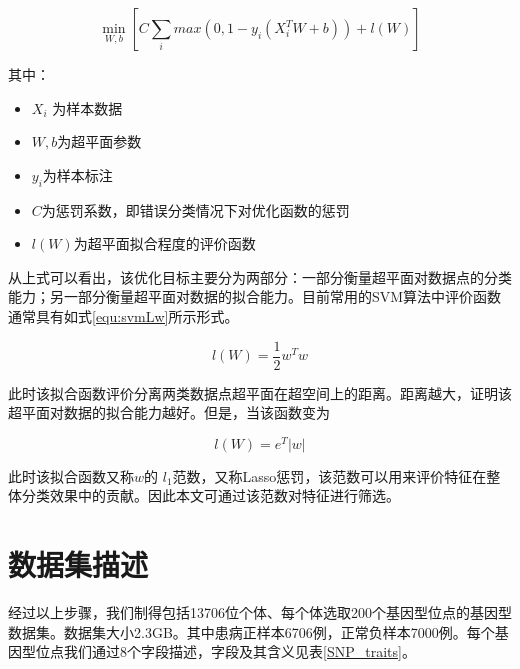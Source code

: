 \begin{equation}
    \min_{W,b} [C\sum_{i}max(0,1-y_i(X_i^TW+b))+l(W)]
\end{equation}

其中：

\begin{itemize}
\item
  \(X_i\) 为样本数据
\item
  \(W,b\)为超平面参数
\item
  \(y_i\)为样本标注
\item
  \(C\)为惩罚系数，即错误分类情况下对优化函数的惩罚
\item
  \(l(W)\)为超平面拟合程度的评价函数
\end{itemize}

从上式可以看出，该优化目标主要分为两部分：一部分衡量超平面对数据点的分类能力；另一部分衡量超平面对数据的拟合能力。目前常用的SVM算法中评价函数通常具有如式\ref{equ:svmLw}所示形式。

\begin{equation}\label{equ:svmLw}
    l(W)=\frac{1}{2}w^Tw
\end{equation}


此时该拟合函数评价分离两类数据点超平面在超空间上的距离。距离越大，证明该超平面对数据的拟合能力越好。但是，当该函数变为

\begin{equation}
    l(W)=e^T|w|
\end{equation}

此时该拟合函数又称$w$的 $l_1$范数，又称Lasso惩罚\cite{tibshirani_regression_1996}，该范数可以用来评价特征在整体分类效果中的贡献\cite{fung_feature_2004}。因此本文可通过该范数对特征进行筛选。

\section{数据集描述}
经过以上步骤，我们制得包括13706位个体、每个体选取200个基因型位点的基因型数据集。数据集大小2.3GB。其中患病正样本6706例，正常负样本7000例。每个基因型位点我们通过8个字段描述，字段及其含义见表\ref{SNP_traits}。

